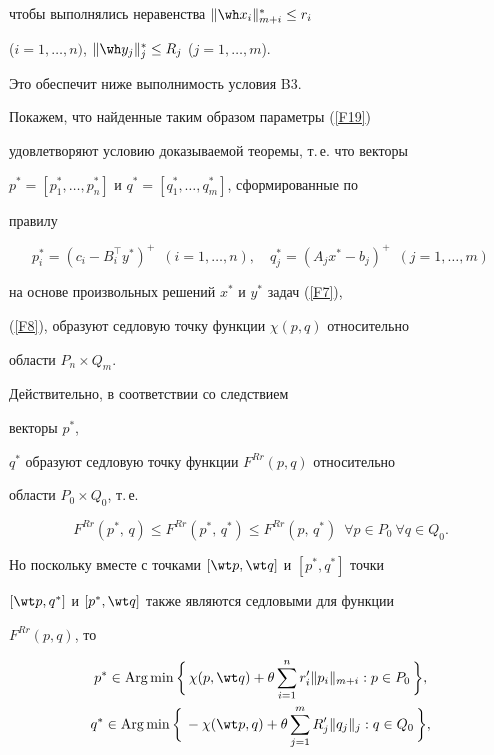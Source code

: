 чтобы выполнялись неравенства $ \| \wh x_i \|^*_{m+i}\le r_i$


($i=1,\dotsc,n)$, $\|\wh y_j \|^*_j \le R_j$ ($j=1,\dotsc, m$).


Это обеспечит ниже выполнимость условия B3.





Покажем, что найденные таким образом параметры (\ref{F19})


удовлетворяют условию доказываемой теоремы, т.\,е.{} что векторы


$p^*=[p^*_1,\dotsc,p^*_n]$ и $q^*=[q^*_1,\dotsc,q^*_m]$, сформированные по


правилу


$$


p^*_i=(c_i-B_i^{\top}y^*)^+\ \; (i=1,\dotsc,n), \quad


q^*_j=(A_jx^*-b_j)^+\ \; (j=1,\dotsc,m)


$$


на основе произвольных решений $x^*$ и $y^*$ задач (\ref{F7}),


(\ref{F8}), образуют седловую точку функции $\chi(p,q)$ относительно


области $P_n\times Q_m$.





Действительно, в соответствии со следствием


векторы $p^*$,


$q^*$ образуют седловую точку функции $F^{Rr}(p,q)$ относительно


области $P_0\times Q_0$, т.\,е.


\begin{equation}


\label{F20}


F^{Rr}(p^*,\, q)\le F^{Rr}( p^*,\, q^*)\le


F^{Rr}(p,\, q^*)\ \; \forall p\in P_0\ \forall q\in Q_0.


\end{equation}


Но поскольку вместе с точками $[\wt p,\wt q]$ и $[p^*,q^*]$ точки


$[\wt p,q^*]$ и $[p^*,\wt q]$ также являются седловыми для функции


$F^{Rr}(p,q)$, то


\begin{gather*}


p^* \in \Arg\min\bigg\{\, \chi(p,\wt q) + \theta \sum\limits^n_{i=1}


r'_i\| p_i\|_{m+i}: p\in P_0\,\bigg\},\\


%


q^* \in \Arg\min\bigg\{\, -\chi(\wt p, q) + \theta


\sum\limits^m_{j=1} R'_j\| q_j\|_j: q\in Q_0\,\bigg\},


\end{gather*}


